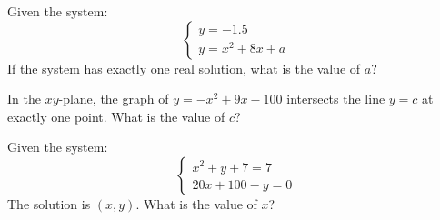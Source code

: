 \vspace{0.75em}


\vspace{2em}

\noindent\markforreview
\vspace{1em}

Given the system:  
\[
\begin{cases}
y = -1.5 \\
y = x^2 + 8x + a
\end{cases}
\]  
If the system has exactly one real solution, what is the value of \(a\)?

\vspace{0.75em}

\newpage 

\noindent\markforreview
\vspace{1em}

In the \(xy\)-plane, the graph of \(y = -x^2 + 9x - 100\)  
intersects the line \(y = c\) at exactly one point.  
What is the value of \(c\)?

\vspace{0.75em}


\vspace{2em}

\noindent\markforreview
\vspace{1em}

Given the system:  
\[
\begin{cases}
x^2 + y + 7 = 7 \\
20x + 100 - y = 0
\end{cases}
\]  
The solution is \((x, y)\). What is the value of \(x\)?




\newpage 

